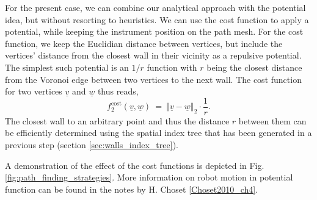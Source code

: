 For the present case, we can combine our analytical approach with the potential idea, but without 
resorting to heuristics. We can use the cost function to apply a potential, while keeping the
instrument position on the path mesh.
For the cost function, we keep the Euclidian distance between vertices, but include the vertices' 
distance from the closest wall in their vicinity as a repulsive potential. 
The simplest such potential is an $1/r$ function with $r$ being the closest distance from the 
Voronoi edge between two vertices to the next wall.
The cost function for two vertices $\underline{v}$ and $\underline{w}$ thus reads,
\begin{equation}
	f^{\mathrm{cost}}_2\left(\underline{v}, \underline{w} \right) \ = \ 
	\left\Vert \underline{v} - \underline{w} \right\Vert_2 \cdot \frac{1}{r}.
\end{equation}
The closest wall to an arbitrary point and thus the distance $r$ between them can be efficiently
determined using the spatial index tree that has been generated in a previous step
(section \ref{sec:walls_index_tree}).

A demonstration of the effect of the cost functions is depicted in Fig. \ref{fig:path_finding_strategies}.
More information on robot motion in potential function can be found in the notes by H. Choset \ref{Choset2010_ch4}.


